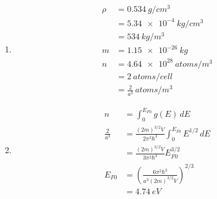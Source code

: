 \documentclass{article}
\begin{document}
\begin{enumerate}
  \item

        \begin{align*}
          \rho & = \qty{0.534}{g/cm^3}              \\
               & = \qty{5.34e-4}{kg/cm^3}           \\
               & = \qty{534}{kg/m^3}                \\
          m    & = \qty{1.15e-26}{kg}               \\
          n    & = \qty{4.64e28}{atoms/m^3}         \\
               & = \qty{2}{atoms/cell}              \\
               & = \frac{2}{a^3} \,\unit{atoms/m^3}
        \end{align*}

  \item

        \begin{align*}
          n             & = \int_0^{E_{F 0}} g(E) \,d E                                              \\
          \frac{2}{a^3} & = \frac{(2 m)^{3 / 2} V}{2 \pi^2 \hbar^3} \int_0^{E_{F 0}} E^{1 / 2} \,d E \\
                        & = \frac{(2 m)^{3 / 2} V}{3 \pi^2 \hbar^3} E_{F 0}^{3 / 2}                  \\
          E_{F 0}       & = \left( \frac{6 \pi^2 \hbar^3}{a^3 (2 m)^{3 / 2} V} \right)^{2 / 3}       \\
                        & = \qty{4.74}{eV}
        \end{align*}
\end{enumerate}

\setcounter{subsubsection}{50}
\subsubsection{}
\end{document}
